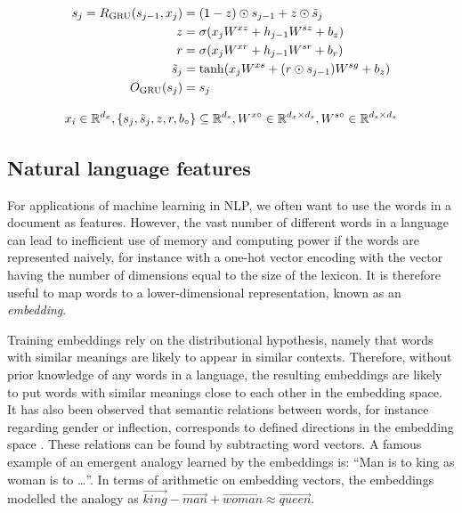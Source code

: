 \begin{gather} \label{eq:gru}
  \begin{split}
  s_j = R_{\text{GRU}}(s_{j-1}, x_j) &= (1 - z) \odot s_{j-1} + z \odot {\tilde s}_j \\
                            z &= \sigma(x_j W^{xz} + h_{j-1} W^{sz} + b_z) \\
                            r &= \sigma(x_j W^{xr} + h_{j-1} W^{sr} + b_r) \\
                 {\tilde s}_j &= \tanh(x_j W^{xs} + (r \odot s_{j-1}) W^{sg} + b_z) \\
          O_{\text{GRU}}(s_j) &= s_j
  \end{split}
  \\[2ex]
  x_i\in \mathbb{R}^{d_x},
  \left\{s_j, {\tilde s}_j, z, r, b_{\circ}\right\} \subseteq \mathbb{R}^{d_s},
  W^{x\circ}\in \mathbb{R}^{d_x\times d_s},
  W^{s\circ}\in \mathbb{R}^{d_s\times d_s} \notag
\end{gather}


\subsection{Natural language features}

For applications of machine learning in \ac{NLP}, we often want to use the
words in a document as features. However, the vast number of different words
in a language can lead to inefficient use of memory and computing power if
the words are represented naively, for instance with a one-hot vector
encoding with the vector having the number of dimensions equal to the size of
the lexicon. It is therefore useful to map words to a lower-dimensional
representation, known as an \emph{embedding}.

\sloppy
Training embeddings rely on the distributional hypothesis, namely that words
with similar meanings are likely to appear in similar contexts. Therefore,
without prior knowledge of any words in a language, the resulting embeddings
are likely to put words with similar meanings close to each other in the
embedding space. It has also been observed that semantic relations between
words, for instance regarding gender or inflection, corresponds to defined
directions in the embedding space \autocite{mikolov2013linguistic}. These
relations can be found by subtracting word vectors. A famous example of an
emergent analogy learned by the embeddings is: ``Man is to king as woman is
to …''. In terms of arithmetic on embedding vectors, the embeddings modelled
the analogy as $\vec{king}-\vec{man}+\vec{woman}\approx\vec{queen}$.
\fussy

